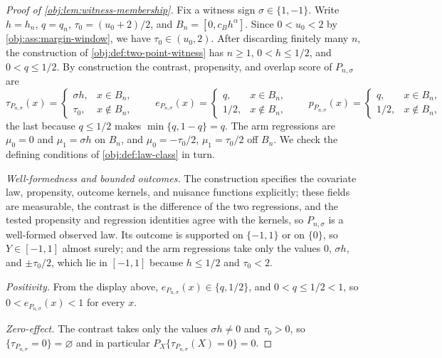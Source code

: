 \documentclass[11pt]{article}
\begin{document}
\begin{proof}[Proof of \cref{obj:lem:witness-membership}]
Fix a witness sign \(\sigma\in\{1,-1\}\).  Write \(h=h_n\), \(q=q_n\), \(\tau_0=(u_0+2)/2\), and \(B_n=[0,c_Bh^\alpha]\).  Since \(0<u_0<2\) by \cref{obj:ass:margin-window}, we have \(\tau_0\in(u_0,2)\).  After discarding finitely many \(n\), the construction of \cref{obj:def:two-point-witness} has \(n\ge1\), \(0<h\le1/2\), and \(0<q\le1/2\). %
By construction the contrast, propensity, and overlap score of \(P_{n,\sigma}\) are
\[
\tau_{P_{n,\sigma}}(x)=
\begin{cases}\sigma h,&x\in B_n,\\ \tau_0,&x\notin B_n,\end{cases}
\qquad
e_{P_{n,\sigma}}(x)=
\begin{cases}q,&x\in B_n,\\ 1/2,&x\notin B_n,\end{cases}
\qquad
p_{P_{n,\sigma}}(x)=
\begin{cases}q,&x\in B_n,\\ 1/2,&x\notin B_n,\end{cases}
\]
the last because \(q\le1/2\) makes \(\min\{q,1-q\}=q\).  The arm regressions are \(\mu_0=0\) and \(\mu_1=\sigma h\) on \(B_n\), and \(\mu_0=-\tau_0/2\), \(\mu_1=\tau_0/2\) off \(B_n\).  We check the defining conditions of \cref{obj:def:law-class} in turn.

\emph{Well-formedness and bounded outcomes.}  The construction specifies the covariate law, propensity, outcome kernels, and nuisance functions explicitly; these fields are measurable, the contrast is the difference of the two regressions, and the tested propensity and regression identities agree with the kernels, so \(P_{n,\sigma}\) is a well-formed observed law. %
Its outcome is supported on \(\{-1,1\}\) or on \(\{0\}\), so \(Y\in[-1,1]\) almost surely; and the arm regressions take only the values \(0\), \(\sigma h\), and \(\pm\tau_0/2\), which lie in \([-1,1]\) because \(h\le1/2\) and \(\tau_0<2\). %

\emph{Positivity.}  From the display above, \(e_{P_{n,\sigma}}(x)\in\{q,1/2\}\), and \(0<q\le1/2<1\), so \(0<e_{P_{n,\sigma}}(x)<1\) for every \(x\). %

\emph{Zero-effect.}  The contrast takes only the values \(\sigma h\ne0\) and \(\tau_0>0\), so \(\{\tau_{P_{n,\sigma}}=0\}=\varnothing\) and in particular \(P_X\{\tau_{P_{n,\sigma}}(X)=0\}=0\). %


\end{proof}
\end{document}
